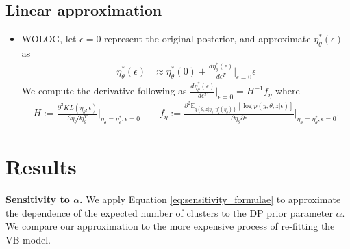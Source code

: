 \documentclass[a0,plainsections]{sciposter}\usepackage[]{graphicx}\usepackage[]{color}
\newcommand{\Expect}{\mathbb{E}}
\newcommand{\etazopt}{\eta_z^{*}}
\newcommand{\etathetaopt}{\eta_\theta^{*}}
\newcommand{\QExpect}
{\Expect_{q\left(\theta, z \vert \eta_\theta, \etazopt(\eta_\theta)\right)}}
\newcommand{\atzero}{\Big\rvert_{\eta_\theta = \etathetaopt, \epsilon = 0}}
\begin{document}
\hfill \vrule \hfill
\begin{minipage}[t]{0.45\textwidth}

\vspace{0.3in}
\subsection*{Linear approximation}
\vspace{-0.3in}
\begin{itemize}
\item WOLOG, let $\epsilon=0$ represent the original posterior, and approximate $\etathetaopt(\epsilon)$ as  
\begin{align}
\etathetaopt(\epsilon)  &\approx  \etathetaopt(0) + 
\frac{d \etathetaopt(\epsilon)}{d\epsilon^T}\Big|_{\epsilon=0} \epsilon
\end{align}
We compute the derivative following \cite{giordano:2017:covariances} as $\frac{d \etathetaopt(\epsilon)}{d\epsilon^T}\Big|_{\epsilon=0} = H^{-1} f_\eta$ 
where 
\begin{align}
H := \frac{\partial^2 KL(\eta_\theta, \epsilon) }{
    \partial \eta_\theta \partial \eta_\theta^T}
    \atzero
\qquad 
f_\eta := \frac{\partial^2
    \QExpect \left[ \log p\left(y, \theta, z \vert \epsilon \right) \right]}{\partial \eta_\theta \partial \epsilon}
    \atzero.
    \label{eq:sensitivity_formulae}
\end{align}
\end{itemize}




\section*{Results}
{\bf \large Sensitivity to $\alpha$. }
We apply Equation \ref{eq:sensitivity_formulae} to approximate the dependence of the expected number of clusters to the DP prior parameter $\alpha$. We compare our approximation to the more expensive process of re-fitting the VB model.  
%





\end{minipage}
\end{document}
